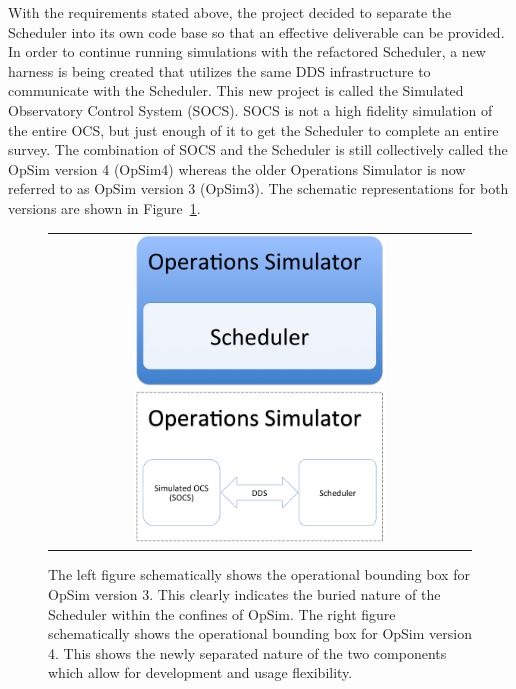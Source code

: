 \documentclass[]{spie}  %
\begin{document}
With the requirements stated above, the project decided to separate the Scheduler\cite{Delgado_SPIE2016} into its own code base so that an effective deliverable can be provided.  In order to continue running simulations with the refactored Scheduler, a new harness is being created that utilizes the same DDS infrastructure to communicate with the Scheduler. This new project is called the Simulated Observatory Control System (SOCS). SOCS is not a high fidelity simulation of the entire OCS, but just enough of it to get the Scheduler to complete an entire survey. The combination of SOCS and the Scheduler is still collectively called the OpSim version 4 (OpSim4) whereas the older Operations Simulator is now referred to as OpSim version 3 (OpSim3). The schematic representations for both versions are shown in Figure~\ref{fig:opsim}.

\begin{figure} [ht]
  	\begin{center}
  		\begin{tabular}{c} 
  			\includegraphics[height=4cm]{Opsimv3.png}
  			\includegraphics[height=4cm]{Opsimv4.png}
  		\end{tabular}
  	\end{center}
  	\caption[What is this?] 
  	{ \label{fig:opsim} 
  		The left figure schematically shows the operational bounding box for OpSim version 3. This clearly indicates the buried nature of the Scheduler within the confines of OpSim. The right figure schematically shows the operational bounding box for OpSim version 4. This shows the newly separated nature of the two components which allow for development and usage flexibility.}
\end{figure} 
\end{document}
